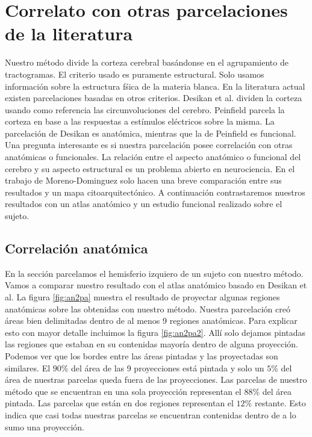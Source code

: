 \section{Correlato con otras parcelaciones de la literatura}

Nuestro m\'etodo divide la corteza cerebral bas\'andonse en el 
agrupamiento de tractogramas. El criterio usado es puramente estructural.
Solo usamos informaci\'on sobre la estructura f\'sica de la materia
blanca. En la literatura actual existen parcelaciones basadas en otros
criterios. Desikan et al. \cite{Desikan2006} dividen la corteza usando
como referencia las circunvoluciones del cerebro. Peinfield 
\cite{Penfield1954} parcela la corteza en base a las respuestas a 
est\'imulos el\'ectricos sobre la misma. La parcelaci\'on de Desikan es
anat\'omica, mientras que la de Peinfield es funcional. Una pregunta
interesante es si nuestra parcelaci\'on posee correlaci\'on con otras
anat\'omicas o funcionales. La relaci\'on entre el aspecto anat\'omico o
funcional del cerebro y su aspecto estructural es un problema abierto en
neurociencia.  En el trabajo de Moreno-Dominguez solo hacen una breve
comparaci\'on entre sus resultados y un mapa citoarquitect\'onico. A 
continuaci\'on contrastaremos nuestros resultados con un atlas anat\'omico
y un estudio funcional realizado sobre el sujeto.  \\


\subsection{Correlaci\'on anat\'omica}

En la secci\'on \label{sec:corteza_nuestro} parcelamos el hemisferio 
izquiero de un sujeto con nuestro m\'etodo. Vamos a comparar nuestro
resultado con el atlas anat\'omico basado en Desikan et al. 
\cite{Desikan2006}
La figura \ref{fig:an2pa} muestra el resultado de proyectar algunas
regiones anat\'omicas sobre las obtenidas con nuestro m\'etodo. Nuestra
parcelaci\'on cre\'o \'areas bien delimitadas dentro de al menos 9
regiones anat\'omicas. Para explicar esto con mayor detalle incluimos la
figura \ref{fig:an2pa2}. All\'i solo dejamos pintadas las regiones que 
estaban en su contenidas mayor\'ia dentro de alguna proyecci\'on. Podemos
ver que los bordes entre las \'areas pintadas y las proyectadas son
similares. El $90\%$ del \'area de las 9 proyecciones est\'a pintada y 
solo un $5\%$ del \'area de nuestras parcelas queda fuera de las
proyecciones. Las parcelas de nuestro m\'etodo que se encuentran en una
sola proyecci\'on representan el $88\%$ del \'area pintada. Las parcelas
que est\'an en dos regiones representan el $12\%$ restante. Esto indica que casi todas nuestras parcelas se encuentran contenidas dentro de a lo
sumo una proyecci\'on. \\

